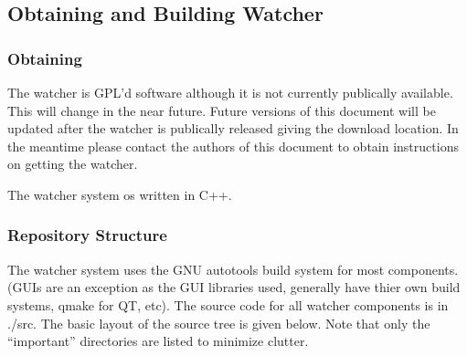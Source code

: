 \documentclass{article}
\begin{document}
\subsection{Obtaining and Building Watcher}
\subsubsection{Obtaining}
The watcher is GPL'd software although it is not currently publically available. This will change in the near future. Future versions of this 
document will be updated after the watcher is publically released giving the download location. In the meantime please contact the authors 
of this document to obtain instructions on getting the watcher. 

The watcher system os written in C++. 

\subsubsection{Repository Structure}
The watcher system uses the GNU autotools build system for most components. (GUIs are an exception as the GUI libraries used, generally have 
thier own build systems, qmake for QT, etc).  The source code for all watcher components is in .\slash src. The basic layout of the source tree is given
below. Note that only the ``important'' directories are listed to minimize clutter. 
\end{document}
